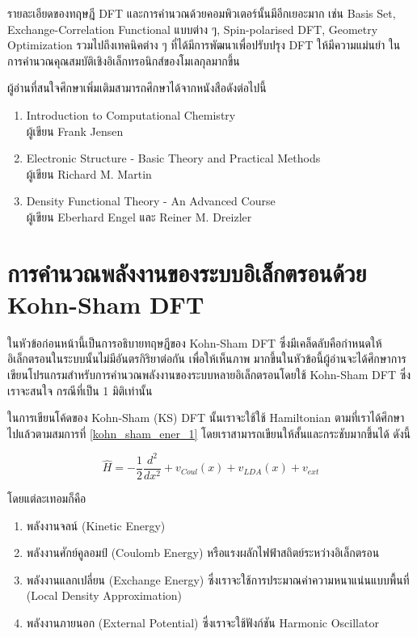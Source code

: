 รายละเอียดของทฤษฎี DFT และการคำนวณด้วยคอมพิวเตอร์นั้นมีอีกเยอะมาก เช่น Basis Set, Exchange-Correlation Functional 
แบบต่าง ๆ, Spin-polarised DFT, Geometry Optimization รวมไปถึงเทคนิคต่าง ๆ ที่ได้มีการพัฒนาเพื่อปรับปรุง DFT ให้มีความแม่นยำ%
ในการคำนวณคุณสมบัติเชิงอิเล็กทรอนิกส์ของโมเลกุลมากขึ้น 

ผู้อ่านที่สนใจศึกษาเพิ่มเติมสามารถศึกษาได้จากหนังสือดังต่อไปนี้

\begin{enumerate}[topsep=0pt]
    \item Introduction to Computational Chemistry \\ ผู้เขียน Frank Jensen
    
    \item Electronic Structure - Basic Theory and Practical Methods \\ ผู้เขียน Richard M. Martin
    
    \item Density Functional Theory - An Advanced Course \\ ผู้เขียน Eberhard Engel และ Reiner M. Dreizler
\end{enumerate}

\section{การคำนวณพลังงานของระบบอิเล็กตรอนด้วย Kohn-Sham DFT}
\label{sec:calc_ener_kohn_sham}

ในหัวข้อก่อนหน้านี้เป็นการอธิบายทฤษฎีของ Kohn-Sham DFT ซึ่งมีเคล็ดลับคือกำหนดให้อิเล็กตรอนในระบบนั้นไม่มีอันตรกิริยาต่อกัน เพื่อให้เห็นภาพ%
มากขึ้นในหัวข้อนี้ผู้อ่านจะได้ศึกษาการเขียนโปรแกรมสำหรับการคำนวณพลังงานของระบบหลายอิเล็กตรอนโดยใช้ Kohn-Sham DFT ซึ่งเราจะสนใจ%
กรณีที่เป็น 1 มิติเท่านั้น

ในการเขียนโค้ดของ Kohn-Sham (KS) DFT นั้นเราจะใช้ใช้ Hamiltonian ตามที่เราได้ศึกษาไปแล้วตามสมการที่ \ref{kohn_sham_ener_1} 
โดยเราสามารถเขียนให้สั้นและกระชับมากขึ้นได้ ดังนี้

\begin{equation}
    \hat{H} = -\frac{1}{2} \frac{d^2}{dx^2} + v_{Coul}(x) + v_{LDA}(x) + v_{ext}
\end{equation}

\noindent โดยแต่ละเทอมก็คือ

\begin{enumerate}[topsep=0pt,noitemsep]
    \item พลังงานจลน์ (Kinetic Energy)
    \item พลังงานศักย์คูลอมป์ (Coulomb Energy) หรือแรงผลักไฟฟ้าสถิตย์ระหว่างอิเล็กตรอน
    \item พลังงานแลกเปลี่ยน (Exchange Energy) ซึ่งเราจะใช้การประมาณค่าความหนาแน่นแบบพื้นที่ (Local Density Approximation) 
    \item พลังงานภายนอก (External Potential) ซึ่งเราจะใช้ฟังก์ชัน Harmonic Oscillator
\end{enumerate}

